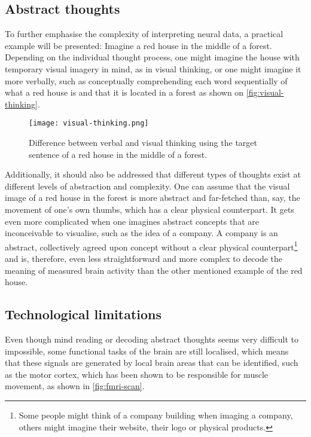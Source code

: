 \subsection{Abstract thoughts}
\label{chapter2-abstract-thoughts}

To further emphasise the complexity of interpreting neural data, a practical example will be presented: Imagine a red house in the middle of a forest. Depending on the individual thought process, one might imagine the house with temporary visual imagery in mind, as in visual thinking, or one might imagine it more verbally, such as conceptually comprehending each word sequentially of what a red house is and that it is located in a forest \citep{amit_asymmetrical_2017} as shown on \autoref{fig:visual-thinking}.

\begin{figure}[ht]
  \centering
  \texttt{[image: visual-thinking.png]}
  \caption{Difference between verbal and visual thinking using the target sentence of a red house in the middle of a forest.}
  \label{fig:visual-thinking}
\end{figure}

Additionally, it should also be addressed that different types of thoughts exist at different levels of abstraction and complexity. One can assume that the visual image of a red house in the forest is more abstract and far-fetched than, say, the movement of one's own thumbs, which has a clear physical counterpart. It gets even more complicated when one imagines abstract concepts that are inconceivable to visualise, such as the idea of a company. A company is an abstract, collectively agreed upon concept without a clear physical counterpart\footnote{Some people might think of a company building when imaging a company, others might imagine their website, their logo or physical products.} and is, therefore, even less straightforward and more complex to decode the meaning of measured brain activity than the other mentioned example of the red house.

\subsection{Technological limitations}
\label{chapter2-technological-limitations}

Even though mind reading or decoding abstract thoughts seems very difficult to impossible, some functional tasks of the brain are still localised, which means that these signals are generated by local brain areas that can be identified, such as the motor cortex, which has been shown to be responsible for muscle movement, as shown in \autoref{fig:fmri-scan}.

